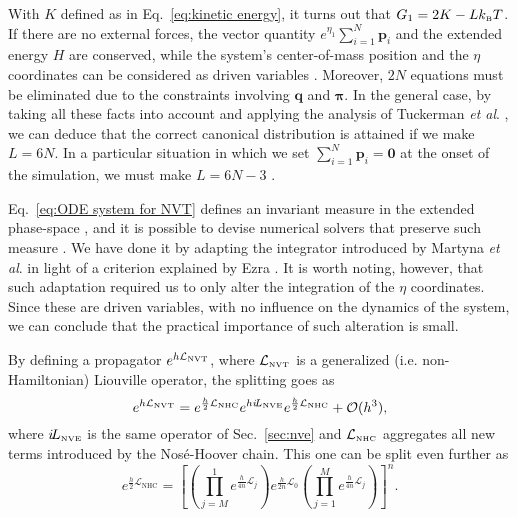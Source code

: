 \documentclass[
	aip,
	jcp,
	reprint,
]{revtex4-1}
\newcommand{\vt}[1]{\boldsymbol{\mathbf{#1}}}          %
\newcommand{\Liu}[1]{i\!L_\text{#1}}                   %
\newcommand{\timestep}{h}
\newcommand{\mini}[1]{\text{\tiny{#1}}}
\begin{document}
With $K$ defined as in Eq.~\eqref{eq:kinetic energy}, it turns out that $G_1 = 2K - L k_\mini{B} T$.
If there are no external forces, the vector quantity $e^{\eta_1}\sum_{i=1}^N {\vt p}_i$ and the extended energy $H$ are conserved, while the system's center-of-mass position and the $\eta$ coordinates can be considered as driven variables \cite{Tuckerman_2001}.
Moreover, $2N$ equations must be eliminated due to the constraints involving $\vt q$ and $\vt \pi$.
In the general case, by taking all these facts into account and applying the analysis of Tuckerman \textit{et al}. \cite{Tuckerman_2001}, we can deduce that the correct canonical distribution is attained if we make $L = 6N$.
In a particular situation in which we set $\sum_{i=1}^N {\vt p}_i = \vt 0$ at the onset of the simulation, we must make $L = 6N - 3$ \cite{Martyna_1994}.

Eq.~\eqref{eq:ODE system for NVT} defines an invariant measure in the extended phase-space \cite{Tuckerman_1999}, and it is possible to devise numerical solvers that preserve such measure \cite{Sergi_2001, Ezra_2004, Ezra_2006}.
We have done it by adapting the integrator introduced by Martyna \textit{et al}. \cite{Martyna_1996} in light of a criterion explained by Ezra \cite{Ezra_2006}.
It is worth noting, however, that such adaptation required us to only alter the integration of the $\eta$ coordinates.
Since these are driven variables, with no influence on the dynamics of the system, we can conclude that the practical importance of such alteration is small.

By defining a propagator $e^{\timestep \mathcal{L}_\mini{NVT}}$, where $\mathcal{L}_\mini{NVT}$ is a generalized (i.e. non-Hamiltonian) Liouville operator, the splitting goes as
\begin{equation}
\label{eq:splitting NVT}
e^{\timestep \mathcal{L}_\mini{NVT}} = e^{\frac{\timestep}{2} \mathcal{L}_\mini{NHC}} e^{\timestep \Liu{\tiny NVE}} e^{\frac{\timestep}{2} \mathcal{L}_\mini{NHC}} + \mathcal{O}(\timestep^3),
\end{equation}
where $\Liu{\tiny NVE}$ is the same operator of Sec.~\ref{sec:nve} and $\mathcal{L}_\mini{NHC}$ aggregates all new terms introduced by the Nos\'e-Hoover chain.
This one can be split even further as
\begin{equation*}
e^{\frac{\timestep}{2} \mathcal{L}_\text{NHC}} = \left[ \left( \textstyle\prod\limits_{j=M}^1 e^{\frac{\timestep}{4n} \mathcal{L}_j }\right) e^{\frac{\timestep}{2n} \mathcal{L}_0 } \left(  \textstyle\prod\limits_{j=1}^M e^{\frac{\timestep}{4n} \mathcal{L}_j }\right)  \right]^n.
\end{equation*}
\end{document}
